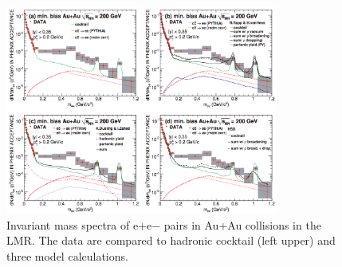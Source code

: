 \begin{figure}
\begin{centering}
\includegraphics[width=0.8\textwidth]{fig/1.Introduction/PHENIX_LowMass}
\par\end{centering}

\protect\caption{Invariant mass spectra of e+e− pairs in Au+Au collisions in the LMR.
The data are compared to hadronic cocktail (left upper) and three
model calculations. \cite{PhysRevC.81.034911}}


\label{fig:PHENIX_Low}
\end{figure}

